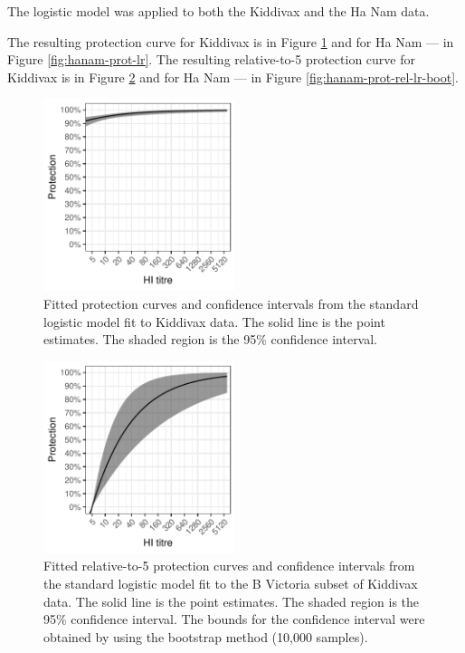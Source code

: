 The logistic model was applied to both the Kiddivax and the Ha Nam data.

The resulting protection curve for Kiddivax is in Figure \ref{fig:kiddyvaxmain-prot-lr} and for Ha Nam --- in Figure \ref{fig:hanam-prot-lr}. The resulting relative-to-5 protection curve for Kiddivax is in Figure \ref{fig:kiddyvaxmain-prot-rel-lr-boot} and for Ha Nam --- in Figure \ref{fig:hanam-prot-rel-lr-boot}.

\begin{figure}[htp]
    \centering
    \includegraphics[width=0.5\textwidth]{../fit-logistic-plot/kiddyvaxmain-bvic-prot.pdf}
    \caption{
        Fitted protection curves and confidence intervals from the standard logistic model fit to Kiddivax data. The solid line is the point estimates. The shaded region is the 95\% confidence interval.
    }
    \label{fig:kiddyvaxmain-prot-lr}
\end{figure}

\begin{figure}[htp]
    \centering
    \includegraphics[width=0.5\textwidth]{../fit-logistic-boot-plot/kiddyvaxmain-bvic-prot-rel.pdf}
    \caption{
        Fitted relative-to-5 protection curves and confidence intervals from the standard logistic model fit to the B Victoria subset of Kiddivax data. The solid line is the point estimates. The shaded region is the 95\% confidence interval. The bounds for the confidence interval were obtained by using the bootstrap method (10,000 samples).
    }
    \label{fig:kiddyvaxmain-prot-rel-lr-boot}
\end{figure}

